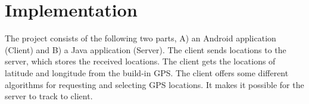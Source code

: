 \section{Implementation}
The project consists of the following two parts, A) an Android application (Client) and B) a Java application (Server). The client sends locations to the server, which stores the received locations. The client gets the locations of latitude and longitude from the build-in GPS. The client offers some different algorithms for requesting and selecting GPS locations. It makes it possible for the server to track to client.


